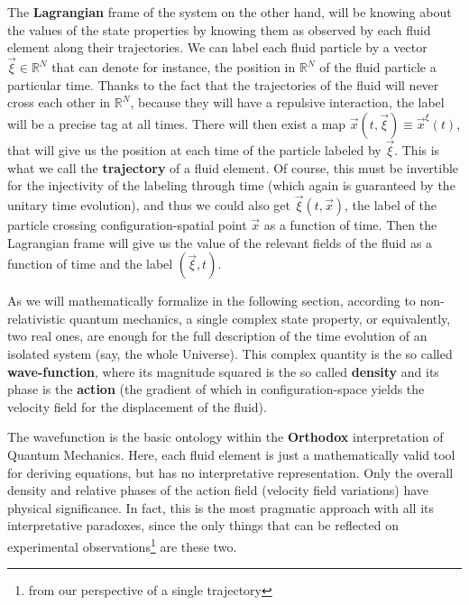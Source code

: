 \documentclass[11pt, a4paper]{article} %
\newcommand{\R}{\mathbb{R}} %
\begin{document}
The {\bf Lagrangian} frame of the system on the other hand, will be knowing about the values of the state properties by knowing them as observed by each fluid element along their trajectories. We can label each fluid particle by a vector $\vec{\xi}\in \R^N$ that can denote for instance, the position in $\R^N$ of the fluid particle a particular time. Thanks to the fact that the trajectories of the fluid will never cross each other in $\R^N$, because they will have a repulsive interaction, the label will be a precise tag at all times. There will then exist a map $\vec{x}(t,\vec{\xi})\equiv \vec{x}^{\xi}(t)$, that will give us the position at each time of the particle labeled by $\vec{\xi}$. This is what we call the {\bf trajectory} of a fluid element. Of course, this must be invertible for the injectivity of the labeling through time (which again is guaranteed by the unitary time evolution), and thus we could also get $\vec{\xi}(t,\vec{x})$, the label of the particle crossing configuration-spatial point $\vec{x}$ as a function of time. Then the Lagrangian frame will give us the value of the relevant fields of the fluid as a function of time and the label $(\vec{\xi},t)$.
 
As we will mathematically formalize in the following section, according to non-relativistic quantum mechanics, a single complex state property, or equivalently, two real ones, are enough for the full description of the time evolution of an isolated system (say, the whole Universe). This complex quantity is the so called {\bf wave-function}, where its magnitude squared is the so called {\bf density} and its phase is the {\bf action} (the gradient of which in configuration-space yields the velocity field for the displacement of the fluid).

The wavefunction is the basic ontology within the {\bf Orthodox} interpretation of Quantum Mechanics. Here, each fluid element is just a mathematically valid tool for deriving equations, but has no interpretative representation. Only the overall density and relative phases of the action field (velocity field variations) have physical significance. In fact, this is the most pragmatic approach with all its interpretative paradoxes, since the only things that can be reflected on experimental observations\footnote{from our perspective of a single trajectory} are these two. 
\end{document}
